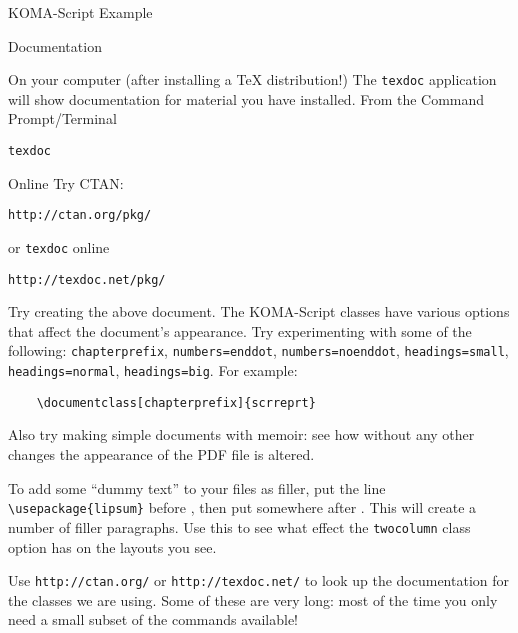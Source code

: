 \begin{frame}{KOMA-Script Example}

  

\end{frame}

\begin{frame}{Documentation}

  \begin{block}{On your computer (after installing a TeX distribution!)}
	The \texttt{texdoc} application will show documentation for material you have installed.
	From the Command Prompt/Terminal
	\begin{center}
	  \texttt{texdoc }
	\end{center}
  \end{block}

  \begin{block}{Online}
	Try CTAN:
	\begin{center}
	  \texttt{http://ctan.org/pkg/}
	\end{center}
	or \texttt{texdoc} online
	\begin{center}
	  \texttt{http://texdoc.net/pkg/}
	\end{center}
  \end{block}

\end{frame}

\begin{exercise}
  Try creating the above document.
  The KOMA-Script classes have various options that affect the document's appearance.
  Try experimenting with some of the following: \texttt{chapterprefix}, \texttt{numbers=enddot}, \texttt{numbers=noenddot}, \texttt{headings=small}, \texttt{headings=normal}, \texttt{headings=big}.
  For example:
  \begin{verbatim}
	\documentclass[chapterprefix]{scrreprt}
  \end{verbatim}

  Also try making simple documents with \textsf{memoir}: see how without any other changes the appearance of the PDF file is altered.

  To add some \enquote{dummy text} to your files as filler, put the line \verb"\usepackage{lipsum}" before \verb"", then put  somewhere after \verb"".
  This will create a number of filler paragraphs.
  Use this to see what effect the \texttt{twocolumn} class option has on the layouts you see.

  Use \texttt{http://ctan.org/} or \texttt{http://texdoc.net/} to look up the documentation for the classes we are using.
  Some of these are very long: most of the time you only need a small subset of the commands available!
\end{exercise}

